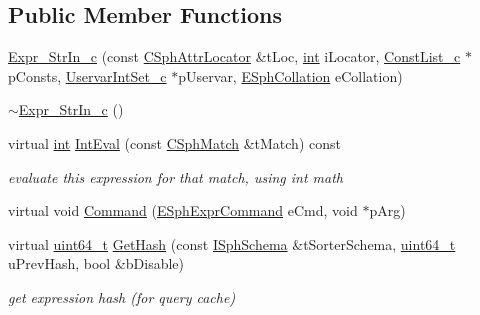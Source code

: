 \subsection*{Public Member Functions}
\begin{DoxyCompactItemize}
\item 
\hyperlink{classExpr__StrIn__c_af3e60e3d495c97b630d484ec9f706e80}{Expr\-\_\-\-Str\-In\-\_\-c} (const \hyperlink{structCSphAttrLocator}{C\-Sph\-Attr\-Locator} \&t\-Loc, \hyperlink{sphinxexpr_8cpp_a4a26e8f9cb8b736e0c4cbf4d16de985e}{int} i\-Locator, \hyperlink{classConstList__c}{Const\-List\-\_\-c} $\ast$p\-Consts, \hyperlink{classUservarIntSet__c}{Uservar\-Int\-Set\-\_\-c} $\ast$p\-Uservar, \hyperlink{sphinxexpr_8h_a78197b7b74319074237ecaf5d99cfbe5}{E\-Sph\-Collation} e\-Collation)
\item 
\hyperlink{classExpr__StrIn__c_a301274755a49738a99a7938d8c024d92}{$\sim$\-Expr\-\_\-\-Str\-In\-\_\-c} ()
\item 
virtual \hyperlink{sphinxexpr_8cpp_a4a26e8f9cb8b736e0c4cbf4d16de985e}{int} \hyperlink{classExpr__StrIn__c_aff34ae98a3c951aec1887c590fe46c2f}{Int\-Eval} (const \hyperlink{classCSphMatch}{C\-Sph\-Match} \&t\-Match) const 
\begin{DoxyCompactList}\small\item\em evaluate this expression for that match, using int math \end{DoxyCompactList}\item 
virtual void \hyperlink{classExpr__StrIn__c_a2097df1c2f318a7a9c9363fecfddb223}{Command} (\hyperlink{sphinxexpr_8h_a30be184fb07bd80c271360fc6094c818}{E\-Sph\-Expr\-Command} e\-Cmd, void $\ast$p\-Arg)
\item 
virtual \hyperlink{sphinxstd_8h_aaa5d1cd013383c889537491c3cfd9aad}{uint64\-\_\-t} \hyperlink{classExpr__StrIn__c_ade280f607479af673eac963a39691f0f}{Get\-Hash} (const \hyperlink{classISphSchema}{I\-Sph\-Schema} \&t\-Sorter\-Schema, \hyperlink{sphinxstd_8h_aaa5d1cd013383c889537491c3cfd9aad}{uint64\-\_\-t} u\-Prev\-Hash, bool \&b\-Disable)
\begin{DoxyCompactList}\small\item\em get expression hash (for query cache) \end{DoxyCompactList}\end{DoxyCompactItemize}
